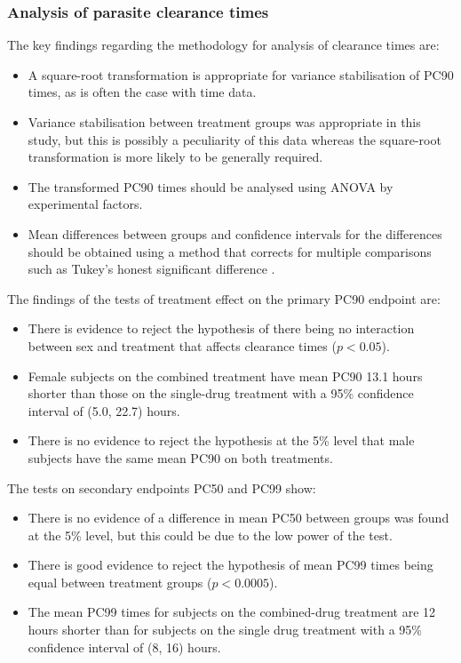 \subsubsection{Analysis of parasite clearance times}
The key findings regarding the methodology for analysis of clearance times are:
\begin{itemize}
\item A square-root transformation is appropriate for variance stabilisation of PC90 times, as is often the case with time data.
\item Variance stabilisation between treatment groups was appropriate in this study, but this is possibly a peculiarity of this data whereas the square-root transformation is more likely to be generally required.
\item The transformed PC90 times should be analysed using ANOVA by experimental factors.
\item Mean differences between groups and confidence intervals for the differences should be obtained using a method that corrects for multiple comparisons such as Tukey's honest significant difference \cite{montgomery}.
\end{itemize}
The findings of the tests of treatment effect on the primary PC90 endpoint are:
\begin{itemize}
\item There is evidence to reject the hypothesis of there being no interaction between sex and treatment that affects clearance times ($p<0.05$).
\item Female subjects on the combined treatment have mean PC90 13.1 hours shorter than those on the single-drug treatment with a 95\% confidence interval of (5.0, 22.7) hours.
\item There is no evidence to reject the hypothesis at the 5\% level that male subjects have the same mean PC90 on both treatments.
\end{itemize}
The tests on secondary endpoints PC50 and PC99 show:
\begin{itemize}
\item There is no evidence of a difference in mean PC50 between groups was found at the 5\% level, but this could be due to the low power of the test.
\item There is good evidence to reject the hypothesis of mean PC99 times being equal between treatment groups ($p<0.0005$).
\item The mean PC99 times for subjects on the combined-drug treatment are 12 hours shorter than for subjects on the single drug treatment with a 95\% confidence interval of (8, 16) hours.
\end{itemize}

